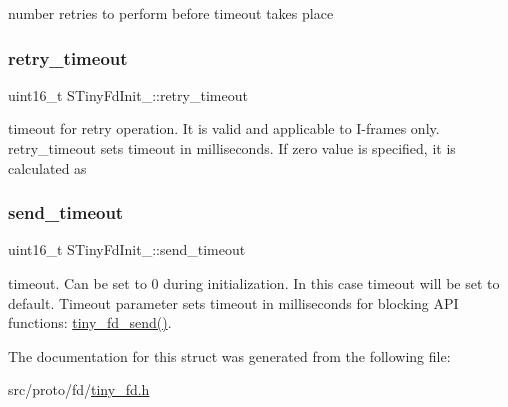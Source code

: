 number retries to perform before timeout takes place \mbox{\label{structSTinyFdInit___a75f9853077c7d614cbdaf49d644ea82a}} 
\subsubsection{\texorpdfstring{retry\+\_\+timeout}{retry\_timeout}}
{\footnotesize\ttfamily uint16\+\_\+t S\+Tiny\+Fd\+Init\+\_\+\+::retry\+\_\+timeout}

timeout for retry operation. It is valid and applicable to I-\/frames only. retry\+\_\+timeout sets timeout in milliseconds. If zero value is specified, it is calculated as \mbox{\label{structSTinyFdInit___a63abe062807f7467de14c366e6ffcd10}} 
\subsubsection{\texorpdfstring{send\+\_\+timeout}{send\_timeout}}
{\footnotesize\ttfamily uint16\+\_\+t S\+Tiny\+Fd\+Init\+\_\+\+::send\+\_\+timeout}

timeout. Can be set to 0 during initialization. In this case timeout will be set to default. Timeout parameter sets timeout in milliseconds for blocking A\+PI functions\+: \hyperlink{group__FULL__DUPLEX__API_ga490157ee98ea6148f99a5bb1f26c5f60}{tiny\+\_\+fd\+\_\+send()}. 

The documentation for this struct was generated from the following file\+:\begin{DoxyCompactItemize}
\item 
src/proto/fd/\hyperlink{tiny__fd_8h}{tiny\+\_\+fd.\+h}\end{DoxyCompactItemize}

